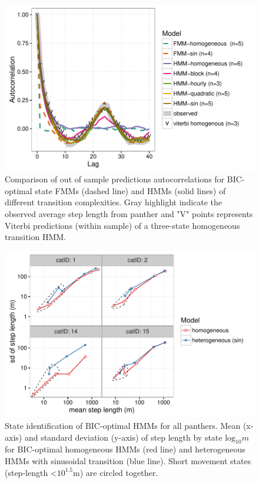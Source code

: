 \documentclass{bmcart}
\begin{document}
\begin{figure}[h!]
   \includegraphics[width=5in]{figure/Figure-4}
  \caption{Comparison of out of sample predictions autocorrelations for BIC-optimal state FMMs (dashed line) and HMMs (solid lines) of different transition complexities. Gray highlight indicate the observed average step length from panther and "V" points represents Viterbi predictions (within sample) of a three-state homogeneous transition HMM.}
      \end{figure}

      
\clearpage


\begin{figure}[h!]
   \includegraphics[width=5in]{figure/Figure-5}
  \caption{State identification of BIC-optimal HMMs for all panthers. Mean (x-axis) and standard deviation (y-axis) of step length by state $\textrm{log}_{10} m$ for BIC-optimal homogeneous HMMs (red line) and heterogeneous HMMs with sinusoidal transition (blue line). Short movement states (step-length \textless $10^{1.5}$m) are circled together.   
  }
      \end{figure}
      
\end{document}
